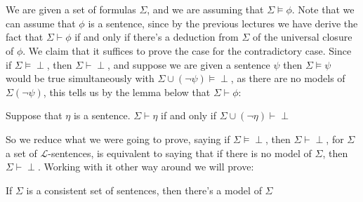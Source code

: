 \documentclass[9pt,a4paper]{article}
\newcommand{\curveL}{\mathcal{L}}
\begin{document}
        \\
        \\
        We are given a set of formulas $\Sigma$, and we are assuming that $\Sigma\vDash \phi$. Note that we can assume that $\phi$ is a sentence, since by the previous lectures we have derive the fact that $\Sigma \vdash \phi$ if and only if there's a deduction from $\Sigma$ of the universal closure of $\phi$. We claim that it suffices to prove the case for the contradictory case. Since if $\Sigma\vDash\perp$, then $\Sigma \vdash \perp$, and suppose we are given a sentence $\psi$ then $\Sigma \vDash \psi$ would be true simultaneously with $\Sigma\cup(\neg\psi) \vDash \perp$, as there are no models of $\Sigma (\neg\psi)$, this tells us by the lemma below that $\Sigma \vdash \phi$:
        \begin{lemma}
            Suppose that $\eta$ is a sentence. $\Sigma\vdash \eta$ if and only if $\Sigma \cup (\neg \eta)\vdash \perp$
        \end{lemma} 
        So we reduce what we were going to prove, saying if $\Sigma\vDash \perp$, then $\Sigma \vdash \perp$, for $\Sigma$ a set of $\curveL$-sentences, is equivalent to saying that if there is no model of $\Sigma$, then $\Sigma \vdash \perp$.  Working with it other way around we will prove:
        \begin{center}
            If $\Sigma$ is a consistent set of sentences, then there's a model of $\Sigma$
        \end{center}
\end{document}
